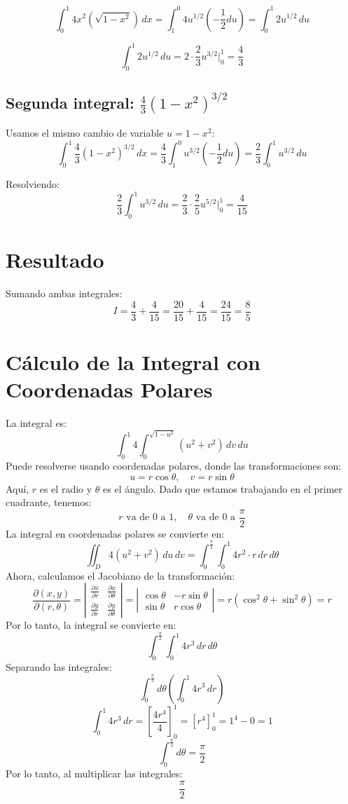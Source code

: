 \[
\int_0^1 4 x^2 (\sqrt{1 - x^2}) \, dx = \int_1^0 4 u^{1/2} \left( -\frac{1}{2} du \right) = \int_0^1 2 u^{1/2} \, du
\]

\[
\int_0^1 2 u^{1/2} \, du = 2 \cdot \frac{2}{3} u^{3/2} \bigg|_0^1 = \frac{4}{3}
\]

\subsection*{Segunda integral: \( \frac{4}{3} (1 - x^2)^{3/2} \)}

Usamos el mismo cambio de variable \( u = 1 - x^2 \):
\[
\int_0^1 \frac{4}{3} (1 - x^2)^{3/2} \, dx = \frac{4}{3} \int_1^0 u^{3/2} \left( -\frac{1}{2} du \right) = \frac{2}{3} \int_0^1 u^{3/2} \, du
\]

Resolviendo:
\[
\frac{2}{3} \int_0^1 u^{3/2} \, du = \frac{2}{3} \cdot \frac{2}{5} u^{5/2} \bigg|_0^1 = \frac{4}{15}
\]

\section*{Resultado}

Sumando ambas integrales:
\[
I = \frac{4}{3} + \frac{4}{15} = \frac{20}{15} + \frac{4}{15} = \frac{24}{15} = \frac{8}{5}
\]

\newpage  %

\section*{Cálculo de la Integral con Coordenadas Polares}

La integral es:
\[
\int_0^1 4 \int_0^{\sqrt{1-u^2}} (u^2 + v^2) \, dv \, du
\]
Puede resolverse usando coordenadas polares, donde las transformaciones son:
\[
u = r \cos \theta, \quad v = r \sin \theta
\]
Aquí, \(r\) es el radio y \(\theta\) es el ángulo. Dado que estamos trabajando en el primer cuadrante, tenemos:
\[
r \text{ va de } 0 \text{ a } 1, \quad \theta \text{ va de } 0 \text{ a } \frac{\pi}{2}
\]
La integral en coordenadas polares se convierte en:
\[
\iint_D 4(u^2 + v^2) \, du \, dv = \int_0^{\frac{\pi}{2}} \int_0^1 4r^2 \cdot r \, dr \, d\theta
\]
Ahora, calculamos el Jacobiano de la transformación:
\[
\frac{\partial(x,y)}{\partial(r,\theta)} = \left| \begin{matrix} \frac{\partial x}{\partial r} & \frac{\partial x}{\partial \theta} \\ \frac{\partial y}{\partial r} & \frac{\partial y}{\partial \theta} \end{matrix} \right| = \left| \begin{matrix} \cos \theta & -r \sin \theta \\ \sin \theta & r \cos \theta \end{matrix} \right| = r(\cos^2 \theta + \sin^2 \theta) = r
\]
Por lo tanto, la integral se convierte en:
\[
\int_0^{\frac{\pi}{2}} \int_0^1 4r^3 \, dr \, d\theta
\]
Separando las integrales:
\[
\int_0^{\frac{\pi}{2}} d\theta \left( \int_0^1 4r^3 \, dr \right)
\]
\[
\int_0^1 4r^3 \, dr = \left[ \frac{4r^4}{4} \right]_0^1 = \left[ r^4 \right]_0^1 = 1^4 - 0 = 1
\]
\[
\int_0^{\frac{\pi}{2}} d\theta = \frac{\pi}{2}
\]
Por lo tanto, al multiplicar las integrales:
\[
\frac{\pi}{2}
\]
